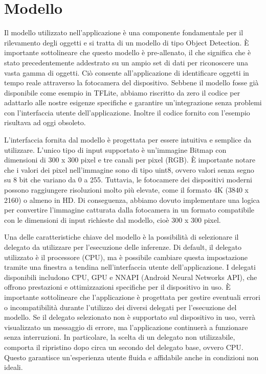 \section{Modello}
Il modello utilizzato nell'applicazione è una componente fondamentale per il rilevamento degli oggetti e si tratta di un modello di tipo Object Detection.
È importante sottolineare che questo modello è pre-allenato, il che significa che è stato precedentemente addestrato su un ampio set di dati per riconoscere
una vasta gamma di oggetti. Ciò consente all'applicazione di identificare oggetti in tempo reale attraverso la fotocamera del dispositivo.
Sebbene il modello fosse già disponibile come esempio in TFLite, abbiamo riscritto da zero il codice per adattarlo alle nostre esigenze specifiche e
garantire un'integrazione senza problemi con l'interfaccia utente dell'applicazione. Inoltre il codice fornito con l’esempio risultava ad oggi obsoleto.

L'interfaccia fornita dal modello è progettata per essere intuitiva e semplice da utilizzare. L'unico tipo di input supportato è un'immagine Bitmap con
dimensioni di 300 x 300 pixel e tre canali per pixel (RGB). È importante notare che i valori dei pixel nell'immagine sono di tipo uint8, ovvero valori
senza segno su 8 bit che variano da 0 a 255.
Tuttavia, le fotocamere dei dispositivi moderni possono raggiungere risoluzioni molto più elevate, come il formato 4K (3840 x 2160) o almeno in HD. Di
conseguenza, abbiamo dovuto implementare una logica per convertire l'immagine catturata dalla fotocamera in un formato compatibile con le dimensioni di
input richieste dal modello, cioè 300 x 300 pixel.

Una delle caratteristiche chiave del modello è la possibilità di selezionare il delegato da utilizzare per l'esecuzione delle inferenze. Di default, il
delegato utilizzato è il processore (CPU), ma è possibile cambiare questa impostazione tramite una finestra a tendina nell'interfaccia utente
dell'applicazione. I delegati disponibili includono CPU, GPU e NNAPI (Android Neural Networks API), che offrono prestazioni e ottimizzazioni specifiche
per il dispositivo in uso.
È importante sottolineare che l'applicazione è progettata per gestire eventuali errori o incompatibilità durante l'utilizzo dei diversi delegati per
l'esecuzione del modello. Se il delegato selezionato non è supportato sul dispositivo in uso, verrà visualizzato un messaggio di errore, ma l'applicazione
continuerà a funzionare senza interruzioni. In particolare, la scelta di un delegato non utilizzabile, comporta il ripristino dopo circa un secondo del
delegato base, ovvero CPU. Questo garantisce un'esperienza utente fluida e affidabile anche in condizioni non ideali.

